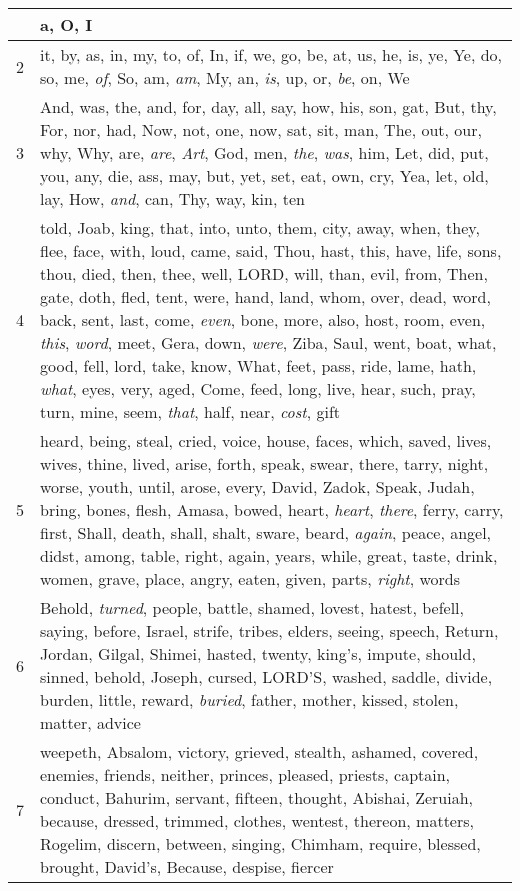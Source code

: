 \begin{longtable}{l|p{3.75in}}
\hline \hline
\endlastfoot
1 & a, O, I \\ \hline
2 & it, by, as, in, my, to, of, In, if, we, go, be, at, us, he, is, ye, Ye, do, so, me, \emph{of}, So, am, \emph{am}, My, an, \emph{is}, up, or, \emph{be}, on, We \\ \hline
3 & And, was, the, and, for, day, all, say, how, his, son, gat, But, thy, For, nor, had, Now, not, one, now, sat, sit, man, The, out, our, why, Why, are, \emph{are}, \emph{Art}, God, men, \emph{the}, \emph{was}, him, Let, did, put, you, any, die, ass, may, but, yet, set, eat, own, cry, Yea, let, old, lay, How, \emph{and}, can, Thy, way, kin, ten \\ \hline
4 & told, Joab, king, that, into, unto, them, city, away, when, they, flee, face, with, loud, came, said, Thou, hast, this, have, life, sons, thou, died, then, thee, well, LORD, will, than, evil, from, Then, gate, doth, fled, tent, were, hand, land, whom, over, dead, word, back, sent, last, come, \emph{even}, bone, more, also, host, room, even, \emph{this}, \emph{word}, meet, Gera, down, \emph{were}, Ziba, Saul, went, boat, what, good, fell, lord, take, know, What, feet, pass, ride, lame, hath, \emph{what}, eyes, very, aged, Come, feed, long, live, hear, such, pray, turn, mine, seem, \emph{that}, half, near, \emph{cost}, gift \\ \hline
5 & heard, being, steal, cried, voice, house, faces, which, saved, lives, wives, thine, lived, arise, forth, speak, swear, there, tarry, night, worse, youth, until, arose, every, David, Zadok, Speak, Judah, bring, bones, flesh, Amasa, bowed, heart, \emph{heart}, \emph{there}, ferry, carry, first, Shall, death, shall, shalt, sware, beard, \emph{again}, peace, angel, didst, among, table, right, again, years, while, great, taste, drink, women, grave, place, angry, eaten, given, parts, \emph{right}, words \\ \hline
6 & Behold, \emph{turned}, people, battle, shamed, lovest, hatest, befell, saying, before, Israel, strife, tribes, elders, seeing, speech, Return, Jordan, Gilgal, Shimei, hasted, twenty, king's, impute, should, sinned, behold, Joseph, cursed, LORD'S, washed, saddle, divide, burden, little, reward, \emph{buried}, father, mother, kissed, stolen, matter, advice \\ \hline
7 & weepeth, Absalom, victory, grieved, stealth, ashamed, covered, enemies, friends, neither, princes, pleased, priests, captain, conduct, Bahurim, servant, fifteen, thought, Abishai, Zeruiah, because, dressed, trimmed, clothes, wentest, thereon, matters, Rogelim, discern, between, singing, Chimham, require, blessed, brought, David's, Because, despise, fiercer \\ \hline

\end{longtable}
